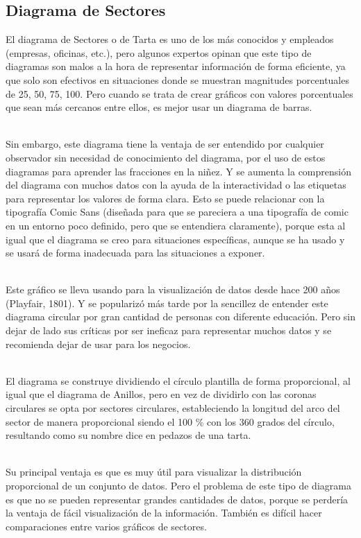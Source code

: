 \documentclass{article}\usepackage[]{graphicx}\usepackage[]{color}
\begin{document}
\subsection{Diagrama de Sectores}
El diagrama de Sectores o de Tarta es uno de los m\'as conocidos y empleados (empresas, oficinas, etc.), pero algunos expertos opinan que este tipo de diagramas son malos a la hora de representar informaci\'on de forma eficiente, ya que solo son efectivos en situaciones donde se muestran magnitudes porcentuales de 25, 50, 75, 100. Pero cuando se trata de crear gr\'aficos con valores porcentuales que sean m\'as cercanos entre ellos, es mejor usar un diagrama de barras\cite{pie-bad}.~\\~\par
Sin embargo, este diagrama tiene la ventaja de ser entendido por cualquier observador sin necesidad de conocimiento del diagrama, por el uso de estos diagramas para aprender las fracciones en la ni\~nez\cite{save-pie}. Y se aumenta la comprensi\'on del diagrama con muchos datos con la ayuda de la interactividad o las etiquetas para representar los valores de forma clara. Esto se puede relacionar con la tipograf\'ia Comic Sans (dise\~nada para que se pareciera a una tipograf\'ia de comic en un entorno poco definido, pero que se entendiera claramente), porque esta al igual que el diagrama se creo para situaciones espec\'ificas, aunque se ha usado y se usar\'a de forma inadecuada para las situaciones a exponer.~\\~\par
Este gr\'afico se lleva usando para la visualizaci\'on de datos desde hace 200 a\~nos (Playfair, 1801). Y se populariz\'o m\'as tarde por la sencillez de entender este diagrama circular por gran cantidad de personas con diferente educaci\'on. Pero sin dejar de lado sus cr\'iticas por ser ineficaz para representar muchos datos y se recomienda dejar de usar para los negocios\cite{humble-pie}.~\\~\par
El diagrama se construye dividiendo el c\'irculo plantilla de forma proporcional, al igual que el diagrama de Anillos, pero en vez de dividirlo con las coronas circulares se opta por sectores circulares, estableciendo la longitud del arco del sector de manera proporcional siendo el 100 \% con los 360 grados del c\'irculo, resultando como su nombre dice en pedazos de una tarta.~\\~\par
Su principal ventaja es que es muy \'util para visualizar la distribuci\'on proporcional de un conjunto de datos. Pero el problema de este tipo de diagrama es que no se pueden representar grandes cantidades de datos, porque se perder\'ia la ventaja de f\'acil visualizaci\'on de la informaci\'on. Tambi\'en es dif\'icil hacer comparaciones entre varios gr\'aficos de sectores.~\\~\par
\end{document}
